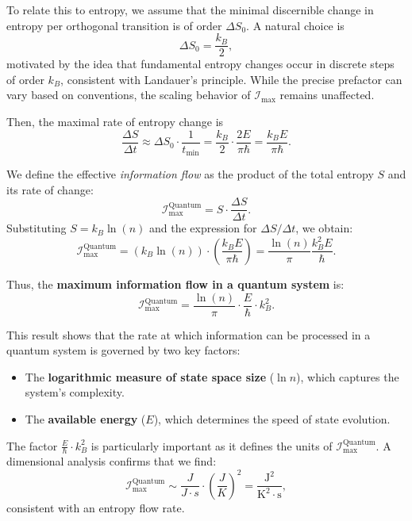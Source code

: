 \documentclass[12pt]{article}
\begin{document}
To relate this to entropy, we assume that the minimal discernible change in entropy per orthogonal transition is of order \( \Delta S_0 \). A natural choice is
\begin{equation}
    \Delta S_0 = \frac{k_B}{2},
\end{equation}
motivated by the idea that fundamental entropy changes occur in discrete steps of order \( k_B \), consistent with Landauer’s principle. While the precise prefactor can vary based on conventions, the scaling behavior of \( \mathcal{I}_{\text{max}} \) remains unaffected.

Then, the maximal rate of entropy change is
\begin{equation}
    \frac{\Delta S}{\Delta t} \approx \Delta S_0 \cdot \frac{1}{t_{\min}}
    = \frac{k_B}{2} \cdot \frac{2E}{\pi \hbar}
    = \frac{k_B E}{\pi \hbar}.
\end{equation}

We define the effective \textit{information flow} as the product of the total entropy \( S \) and its rate of change:
\begin{equation}
    \mathcal{I}_{\text{max}}^{\text{Quantum}} = S \cdot \frac{\Delta S}{\Delta t}.
\end{equation}
Substituting \( S = k_B \ln(n) \) and the expression for \( \Delta S / \Delta t \), we obtain:
\begin{equation}
    \mathcal{I}_{\text{max}}^{\text{Quantum}} 
    = \left(k_B \ln(n)\right) \cdot \left(\frac{k_B E}{\pi \hbar}\right)
    = \frac{\ln(n)}{\pi}\frac{k_B^2 E}{\hbar}.
\end{equation}

Thus, the \textbf{maximum information flow in a quantum system} is:
\begin{equation}
    \mathcal{I}_{\text{max}}^{\text{Quantum}} = \frac{\ln(n)}{\pi} \cdot \frac{E}{\hbar} \cdot k_B^2.
\end{equation}

This result shows that the rate at which information can be processed in a quantum system is governed by two key factors:
\begin{itemize}
    \item The \textbf{logarithmic measure of state space size} (\(\ln n\)), which captures the system’s complexity.
    \item The \textbf{available energy} (\(E\)), which determines the speed of state evolution.
\end{itemize}

The factor $\frac{E}{\hbar} \cdot k_B^2$ is particularly important as it defines the units of $\mathcal{I}_{\text{max}}^{\text{Quantum}}$. A dimensional analysis confirms that we find:
\begin{equation}
    \mathcal{I}_{\text{max}}^{\text{Quantum}} \sim \frac{J}{J \cdot s} \cdot (\frac{J}{K})^2 = \frac{\text{J}^2}{\text{K}^2 \cdot \text{s}},
\end{equation}
consistent with an entropy flow rate.
\end{document}
